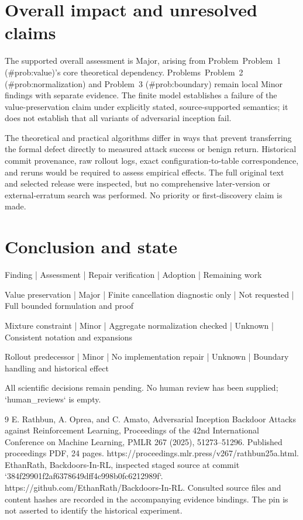 \documentclass[10pt]{article}
\begin{document}
\section*{Overall impact and unresolved claims}
The supported overall assessment is Major, arising from Problem Problem 1 (\#prob:value)’s core theoretical dependency. Problems Problem 2 (\#prob:normalization) and Problem 3 (\#prob:boundary) remain local Minor findings with separate evidence. The finite model establishes a failure of the value-preservation claim under explicitly stated, source-supported semantics; it does not establish that all variants of adversarial inception fail.\par
The theoretical and practical algorithms differ in ways that prevent transferring the formal defect directly to measured attack success or benign return. Historical commit provenance, raw rollout logs, exact configuration-to-table correspondence, and reruns would be required to assess empirical effects. The full original text and selected release were inspected, but no comprehensive later-version or external-erratum search was performed. No priority or first-discovery claim is made.\par
\section*{Conclusion and state}
Finding | Assessment | Repair verification | Adoption | Remaining work\par
Value preservation | Major | Finite cancellation diagnostic only | Not requested | Full bounded formulation and proof\par
Mixture constraint | Minor | Aggregate normalization checked | Unknown | Consistent notation and expansions\par
Rollout predecessor | Minor | No implementation repair | Unknown | Boundary handling and historical effect\par
All scientific decisions remain pending. No human review has been supplied; `human\_reviews` is empty.\par
9 E. Rathbun, A. Oprea, and C. Amato, Adversarial Inception Backdoor Attacks against Reinforcement Learning, Proceedings of the 42nd International Conference on Machine Learning, PMLR 267 (2025), 51273–51296. Published proceedings PDF, 24 pages. https://proceedings.mlr.press/v267/rathbun25a.html. EthanRath, Backdoors-In-RL, inspected staged source at commit `384f29901f2af6378649dff4c998b0fc6212989f`. https://github.com/EthanRath/Backdoors-In-RL. Consulted source files and content hashes are recorded in the accompanying evidence bindings. The pin is not asserted to identify the historical experiment.\par
\end{document}
